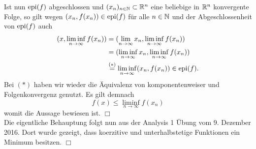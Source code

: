 \begin{itemize}
 \newpage

 Ist nun $\operatorname{epi}(f)$ abgeschlossen und $(x_n)_{n\in\mathbb{N}}\subset \mathbb{R}^n$ eine beliebige in $\mathbb{R}^n$ konvergente Folge, so gilt
 wegen $(x_n,f(x_n))\in\operatorname{epi}(f)$ für alle $n\in\mathbb{N}$ und der Abgeschlossenheit von $\operatorname{epi}(f) $ auch
 \begin{align*}
 (x,\liminf_{n\to\infty}f(x_n)) &= (\lim_{n\to\infty}x_n, \liminf_{n\to\infty}f(x_n)) \\
&= (\liminf_{n\to\infty} x_n, \liminf_{n\to\infty}f(x_n)) \\
&\overset{(*)}{=} \liminf_{n\to\infty}(x_n, f(x_n))\in \operatorname{epi}(f).
 \end{align*}
 Bei $(*)$ haben wir wieder die Äquivalenz von komponentenweiser und Folgenkonvergenz
 genutzt.
 Es gilt demnach
 \begin{displaymath}
  f(x)\leq \liminf_{n\to\infty}f(x_n)
 \end{displaymath}
 womit die Aussage bewiesen ist. \hfill$\Box$\\

 Die eigentliche Behauptung folgt nun aus der Analysis 1 Übung vom 9. Dezember 2016. Dort wurde gezeigt, dass koerzitive und unterhalbstetige Funktionen ein
 Minimum besitzen. \hfill$\Box$
\end{itemize}
